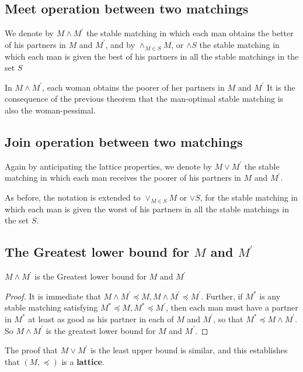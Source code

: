\subsection{Meet operation between two matchings}

We denote by $M \wedge M^\prime$ the stable matching in which each man obtains the better of his partners in $M$ and $M^\prime$, and by $\wedge_{M \in S} M$, or $\wedge S$ the stable matching in which each man is given the best of his partners in all the stable matchings in the set $S$

In $M \wedge M^\prime$, each woman obtains the poorer of her partners in $M$ and $M^\prime$
\newline
It is the consequence of the previous theorem that the man-optimal stable matching is also the woman-pessimal.

\subsection{Join operation between two matchings}
    Again by anticipating the lattice properties, we denote by $M \vee M^\prime$ the stable matching in which each man receives the poorer of his partners in $M$ and $M^\prime$.
    
    As before, the notation is extended to $\vee_{M \in S}M$ or $\vee S$, for the stable matching in which each man is given the worst of his partners in all the stable matchings in the set $S$.

\subsection{The Greatest lower bound for $M$ and $M^\prime$}

\begin{theorem}\label{thm_1_9}
$M \wedge M^\prime$ is the Greatest lower bound for $M$ and $M^\prime$
\end{theorem}

\begin{proof}
It is immediate that $M \wedge M^\prime \preceq M, M \wedge M^\prime \preceq M^\prime$. Further, if $M^*$ is any stable matching satisfying $M^* \preceq M, M^* \preceq M^\prime$, then each man must have a partner in $M^*$ at least as good as his partner in each of $M$ and $M^\prime$, so that $M^* \preceq M \wedge M^\prime$. So $M \wedge M^\prime$ is the greatest lower bound for $M$ and $M^\prime$. 
\end{proof}

    The proof that $M \vee M^\prime$ is the least upper bound is similar, and this establishes that $(M, \preceq)$ is a \textbf{lattice}.

